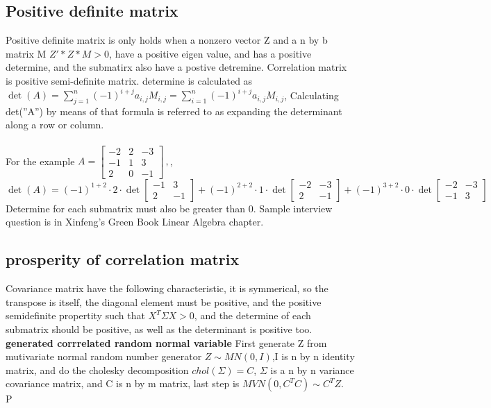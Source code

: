 \documentclass[a4paper,11pt]{article}
\begin{document}
\subsection {Positive definite matrix}
Positive definite matrix is only holds when a nonzero vector Z and a n by b matrix M $Z'*Z*M>0$, have a positive eigen value, and has a positive determine, and the  submatirx also have a postive detremine. Correlation matrix is positive semi-definite matrix.
determine is calculated as $\det(A) = \sum_{j=1}^n (-1)^{i+j} a_{i,j} M_{i,j} = \sum_{i=1}^n (-1)^{i+j} a_{i,j} M_{i,j}$, Calculating det(''A'') by means of that formula is referred to as expanding the determinant along a row or column.\\\\
For the example
$A = \begin{bmatrix}-2&2&-3\\
-1& 1& 3\\
2 &0 &-1\end{bmatrix} \,,$, $\det(A)=(-1)^{1+2}\cdot 2 \cdot \det \begin{bmatrix}-1&3\\ 2 &-1\end{bmatrix} + (-1)^{2+2}\cdot 1 \cdot \det \begin{bmatrix}-2&-3\\ 2&-1\end{bmatrix} + (-1)^{3+2}\cdot 0 \cdot \det \begin{bmatrix}-2&-3\\ -1&3\end{bmatrix}$\\
Determine for each submatrix must also be greater than 0. Sample interview question is in Xinfeng's Green Book Linear Algebra chapter.\\

\subsection{prosperity of correlation matrix}
Covariance matrix have the following characteristic, it is symmerical, so the transpose is itself, the diagonal element must be positive, and the positive semidefinite propertity such that $X^T\Sigma X>0$, and the determine of each submatrix should be positive, as well as the determinant is positive too.\\
{\bf generated corrrelated random normal variable}
First generate Z from mutivariate normal random number generator $Z \sim MN(0,I)$,I is n by n identity matrix, and do the cholesky decomposition $chol(\Sigma)=C$, $\Sigma$ is a n by n variance covariance matrix, and C is n by m matrix, last step is $ MVN(0,C^TC) \sim C^T Z$.\\P
\end{document}
